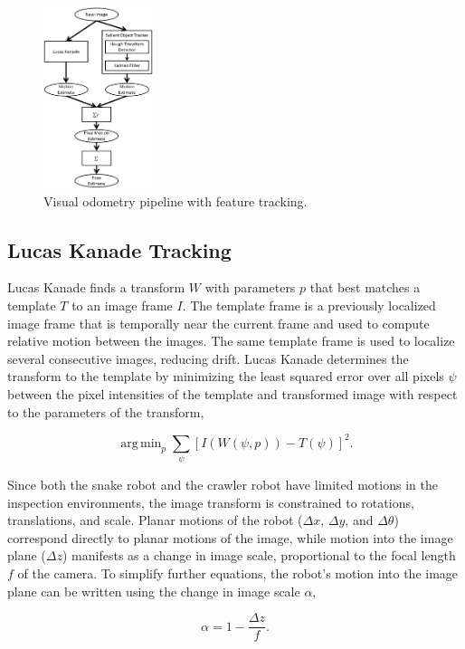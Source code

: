 \documentclass[letterpaper, 10 pt, conference]{ieeeconf}
\DeclareMathOperator*{\argmin}{arg\,min}
\begin{document}
\begin{figure}[tb]
	\centering
	\includegraphics[height=200px]{approach_overview.png}
	\caption{Visual odometry pipeline with feature tracking.}
    \label{approach}
\end{figure}

\subsection{Lucas Kanade Tracking}

Lucas Kanade finds a transform $W$ with parameters $p$ that best matches a template $T$ to an image frame $I$. The template frame is a previously localized image frame that is temporally near the current frame and used to compute relative motion between the images. The same template frame is used to localize several consecutive images, reducing drift. Lucas Kanade determines the transform to the template by minimizing the least squared error over all pixels $\psi$ between the pixel intensities of the template and transformed image with respect to the parameters of the transform,

\begin{equation} \label{eq:lkt_min}
    \argmin_p \sum_{\psi} [I(W(\psi, p)) - T(\psi)]^2.
\end{equation}

Since both the snake robot and the crawler robot have limited motions in the inspection environments, the image transform is constrained to rotations, translations, and scale. Planar motions of the robot ($\Delta x$, $\Delta y$, and $\Delta \theta$) correspond directly to planar motions of the image, while motion into the image plane ($\Delta z$) manifests as a change in image scale, proportional to the focal length $f$ of the camera. To simplify further equations, the robot's motion into the image plane can be written using the change in image scale $\alpha$,

\begin{equation} \label{eq:z_motion_conversion}
	\alpha = 1 - \frac{\Delta z}{f}.
\end{equation}
\end{document}
